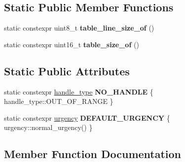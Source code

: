 \subsection*{Static Public Member Functions}
\begin{DoxyCompactItemize}
\item 
\mbox{\label{classfsl_1_1os_1_1scheduler_a4131852481d5d070faeb8d661fcfeb3f}} 
static constexpr uint8\+\_\+t {\bfseries table\+\_\+line\+\_\+size\+\_\+of} ()
\item 
\mbox{\label{classfsl_1_1os_1_1scheduler_ae404033b2b81486ad1952b718e75be7d}} 
static constexpr uint16\+\_\+t {\bfseries table\+\_\+size\+\_\+of} ()
\end{DoxyCompactItemize}
\subsection*{Static Public Attributes}
\begin{DoxyCompactItemize}
\item 
\mbox{\label{classfsl_1_1os_1_1scheduler_a3e51853983b8cfd3008c58850b31ab2a}} 
static constexpr \mbox{\hyperlink{classfsl_1_1lg_1_1range__int}{handle\+\_\+type}} {\bfseries N\+O\+\_\+\+H\+A\+N\+D\+LE} \{ handle\+\_\+type\+::\+O\+U\+T\+\_\+\+O\+F\+\_\+\+R\+A\+N\+GE \}
\item 
\mbox{\label{classfsl_1_1os_1_1scheduler_ab652e8e3c17ac0ebc1f1d85929e6223b}} 
static constexpr \mbox{\hyperlink{classfsl_1_1os_1_1urgency}{urgency}} {\bfseries D\+E\+F\+A\+U\+L\+T\+\_\+\+U\+R\+G\+E\+N\+CY} \{ urgency\+::normal\+\_\+urgency() \}
\end{DoxyCompactItemize}


\subsection{Member Function Documentation}
\mbox{\label{classfsl_1_1os_1_1scheduler_ad707134d03e2028eb598bac3432564a0}} 
